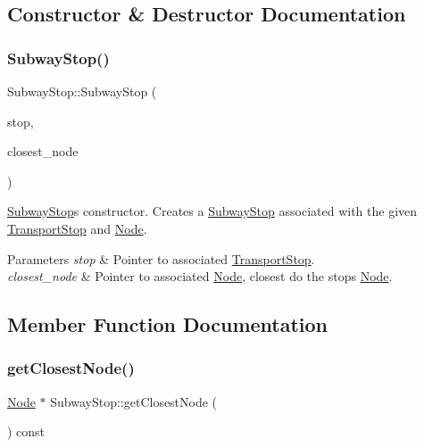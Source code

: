 \subsection{Constructor \& Destructor Documentation}
\hypertarget{class_subway_stop_ae29e3908fe6203af1123150c03b026fe}{}\label{class_subway_stop_ae29e3908fe6203af1123150c03b026fe} 
\subsubsection{\texorpdfstring{Subway\+Stop()}{SubwayStop()}}
{\footnotesize\ttfamily Subway\+Stop\+::\+Subway\+Stop (\begin{DoxyParamCaption}\item[{\hyperlink{class_transport_stop}{Transport\+Stop} $\ast$}]{stop,  }\item[{\hyperlink{class_node}{Node} $\ast$}]{closest\+\_\+node }\end{DoxyParamCaption})}

\hyperlink{class_subway_stop}{Subway\+Stop}\textquotesingle{}s constructor. Creates a \hyperlink{class_subway_stop}{Subway\+Stop} associated with the given \hyperlink{class_transport_stop}{Transport\+Stop} and \hyperlink{class_node}{Node}.


\begin{DoxyParams}{Parameters}
{\em stop} & Pointer to associated \hyperlink{class_transport_stop}{Transport\+Stop}. \\
\hline
{\em closest\+\_\+node} & Pointer to associated \hyperlink{class_node}{Node}, closest do the stop\textquotesingle{}s \hyperlink{class_node}{Node}. \\
\hline
\end{DoxyParams}


\subsection{Member Function Documentation}
\hypertarget{class_subway_stop_a575f9f1c940378cb193b2690ad972cf8}{}\label{class_subway_stop_a575f9f1c940378cb193b2690ad972cf8} 
\subsubsection{\texorpdfstring{get\+Closest\+Node()}{getClosestNode()}}
{\footnotesize\ttfamily \hyperlink{class_node}{Node} $\ast$ Subway\+Stop\+::get\+Closest\+Node (\begin{DoxyParamCaption}{ }\end{DoxyParamCaption}) const}

